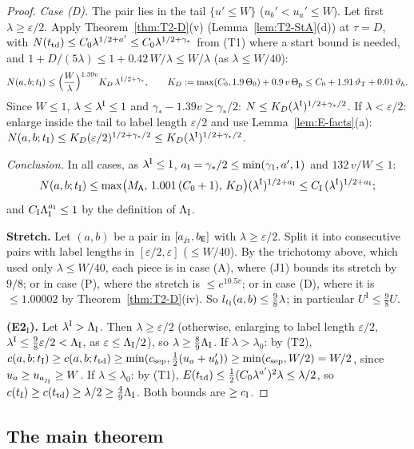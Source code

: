 \begin{proof}
\emph{Case \textup{(D)}.} The pair lies in the tail $\{u'\le W\}$ ($u_b'<u_a'\le W$). Let first $\lambda\ge\varepsilon/2$. Apply
Theorem~\ref{thm:T2-D}(v) (Lemma~\ref{lem:T2-StA}(d)) at $\tau=D$, with $N(t_{\mathrm{td}})\le C_0\lambda^{1/2+a'}\le C_0\lambda^{1/2+\gamma_*}$
from (T1) where a start bound is needed, and $1+D/(5\lambda)\le1+0.42\,W/\lambda\le W/\lambda$ (as $\lambda\le W/40$):
\[
N(a,b;t_{\mathrm I})\le\Bigl(\frac W\lambda\Bigr)^{1.39v}K_D\,\lambda^{1/2+\gamma_*},\qquad
K_D:=\max(C_0,1.9\,\Theta_0)+0.9\,v\,\Theta_{\mathrm p}\le C_0+1.91\,\vartheta_{\mathrm T}+0.01\,\vartheta_h .
\]
Since $W\le1$, $\lambda\le\lambda^{\mathrm I}\le1$ and $\gamma_*-1.39v\ge\gamma_*/2$: $N\le K_D(\lambda^{\mathrm I})^{1/2+\gamma_*/2}$. If
$\lambda<\varepsilon/2$: enlarge inside the tail to label length $\varepsilon/2$ and use Lemma~\ref{lem:E-facts}(a):
$N(a,b;t_{\mathrm I})\le K_D(\varepsilon/2)^{1/2+\gamma_*/2}\le K_D(\lambda^{\mathrm I})^{1/2+\gamma_*/2}$.

\emph{Conclusion.} In all cases, as $\lambda^{\mathrm I}\le1$, $a_{\mathrm I}=\gamma_*/2\le\min(\gamma_1,a',1)$ and $132\,v/W\le1$:
\[
N(a,b;t_{\mathrm I})\le\max\bigl(M_{\mathsf A},\,1.001\,(C_0+1),\,K_D\bigr)(\lambda^{\mathrm I})^{1/2+a_{\mathrm I}}\le C_{\mathrm I}\,(\lambda^{\mathrm I})^{1/2+a_{\mathrm I}};
\]
and $C_{\mathrm I}\Lambda_{\mathrm I}^{a_{\mathrm I}}\le1$ by the definition of $\Lambda_{\mathrm I}$.

\smallskip\textbf{Stretch.} Let $(a,b)$ be a pair in $[a_{j_{\mathrm I}},b_{\mathsf E}]$ with $\lambda\ge\varepsilon/2$. Split it into consecutive
pairs with label lengths in $[\varepsilon/2,\varepsilon]$ ($\le W/40$). By the trichotomy above, which used only
$\lambda\le W/40$, each piece is in case (A), where (J1) bounds its stretch by $9/8$; or in case (P), where the stretch is
$\le e^{10.5v}$; or in case (D), where it is $\le1.00002$ by Theorem~\ref{thm:T2-D}(iv). So $l_{t_{\mathrm I}}(a,b)\le\frac98\lambda$; in
particular $U^{\mathrm I}\le\frac98U$.

\smallskip\textbf{(E2$_{\mathrm I}$).} Let $\lambda^{\mathrm I}>\Lambda_{\mathrm I}$. Then $\lambda\ge\varepsilon/2$ (otherwise, enlarging to label length
$\varepsilon/2$, $\lambda^{\mathrm I}\le\frac98\varepsilon/2<\Lambda_{\mathrm I}$, as $\varepsilon\le\Lambda_{\mathrm I}/2$), so $\lambda\ge\frac89\Lambda_{\mathrm I}$. If
$\lambda>\lambda_0$: by (T2),
$c(a,b;t_{\mathrm I})\ge c(a,b;t_{\mathrm{td}})\ge\min(c_{\mathrm{sep}},\frac12(u_a+u_b'))\ge\min(c_{\mathrm{sep}},W/2)=W/2$, since
$u_a\ge u_{a_{j_{\mathrm I}}}\ge W$. If $\lambda\le\lambda_0$: by (T1), $E(t_{\mathrm{td}})\le\frac12(C_0\lambda^{a'})^2\lambda\le\lambda/2$, so
$c(t_{\mathrm I})\ge c(t_{\mathrm{td}})\ge\lambda/2\ge\frac49\Lambda_{\mathrm I}$. Both bounds are $\ge c_{\mathrm I}$.
\end{proof}

\subsection{The main theorem}

